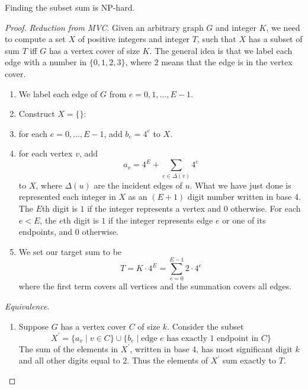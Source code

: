 \documentclass{article}
\begin{document}
    \begin{theorem}
      Finding the subset sum is NP-hard. 
    \end{theorem}
    \begin{proof}
      \textit{Reduction from MVC}. Given an arbitrary graph $G$ and integer $K$, we need to compute a set $X$ of positive integers and integer $T$, such that $X$ has a subset of sum $T$ iff $G$ has a vertex cover of size $K$. The general idea is that we label each edge with a number in $\{0, 1, 2, 3\}$, where $2$ means that the edge is in the vertex cover. 
      \begin{enumerate}
        \item We label each edge of $G$ from $e = 0, 1, \ldots, E-1$. 
        \item Construct $X = \{\}$: 
        \item for each $e = 0, \ldots, E-1$, add $b_e = 4^e$ to $X$. 
        \item for each vertex $v$, add 
        \begin{equation}
          a_v = 4^{E} + \sum_{e \in \Delta(v)} 4^e
        \end{equation}
        to $X$, where $\Delta(u)$ are the incident edges of $u$. What we have just done is represented each integer in $X$ as an $(E + 1)$ digit number written in base 4. The $E$th digit is $1$ if the integer represents a vertex and $0$ otherwise. For each $e < E$, the $e$th digit is $1$ if the integer represents edge $e$ or one of its endpoints, and $0$ otherwise. 

        \item We set our target sum to be 
        \begin{equation}
          T = K \cdot 4^E = \sum_{e=0}^{E-1} 2 \cdot 4^e
        \end{equation}
        where the first term covers all vertices and the summation covers all edges. 
      \end{enumerate}

      \textit{Equivalence}. 
      \begin{enumerate}
        \item Suppose $G$ has a vertex cover $C$ of size $k$. Consider the subset 
        \begin{equation}
          X^\prime = \{a_v \mid v \in C\} \cup \{b_e \mid \text{edge } e \text{ has exactly 1 endpoint in } C\} 
        \end{equation}
        The sum of the elements in $X^\prime$, written in base 4, has most significant digit $k$ and all other digits equal to $2$. Thus the elements of $X^\prime$ sum exactly to $T$. 


\end{enumerate}
\end{proof}
\end{document}
